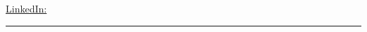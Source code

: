 \begin{center}
	\begin{minipage}[b]{.3\textwidth}
	\raggedright
	{\city} \\ %
	\href{mailto:\email}{\email} %
	\end{minipage}%
	\begin{minipage}[b]{.4\textwidth}
	\makeatletter
	\centering {\HUGE \@author} \\
	\makeatother
    \vspace{.5em}
    {\color{highlight} \Large{\role}}
	\end{minipage}%
	\begin{minipage}[b]{.3\textwidth}
	\raggedleft 
	\href{https://www.linkedin.com/in/\LinkedIn}{LinkedIn: \LinkedIn} %
	\end{minipage}

{\color{highlight} \hrule}
\end{center}